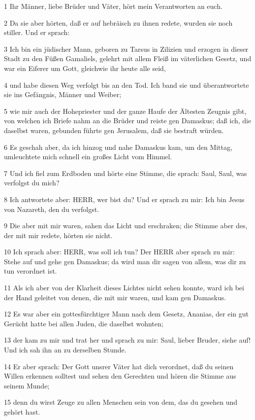 \par 1 Ihr Männer, liebe Brüder und Väter, hört mein Verantworten an euch.
\par 2 Da sie aber hörten, daß er auf hebräisch zu ihnen redete, wurden sie noch stiller. Und er sprach:
\par 3 Ich bin ein jüdischer Mann, geboren zu Tarsus in Zilizien und erzogen in dieser Stadt zu den Füßen Gamaliels, gelehrt mit allem Fleiß im väterlichen Gesetz, und war ein Eiferer um Gott, gleichwie ihr heute alle seid,
\par 4 und habe diesen Weg verfolgt bis an den Tod. Ich band sie und überantwortete sie ins Gefängnis, Männer und Weiber;
\par 5 wie mir auch der Hohepriester und der ganze Haufe der Ältesten Zeugnis gibt, von welchen ich Briefe nahm an die Brüder und reiste gen Damaskus; daß ich, die daselbst waren, gebunden führte gen Jerusalem, daß sie bestraft würden.
\par 6 Es geschah aber, da ich hinzog und nahe Damaskus kam, um den Mittag, umleuchtete mich schnell ein großes Licht vom Himmel.
\par 7 Und ich fiel zum Erdboden und hörte eine Stimme, die sprach: Saul, Saul, was verfolgst du mich?
\par 8 Ich antwortete aber: HERR, wer bist du? Und er sprach zu mir: Ich bin Jesus von Nazareth, den du verfolgst.
\par 9 Die aber mit mir waren, sahen das Licht und erschraken; die Stimme aber des, der mit mir redete, hörten sie nicht.
\par 10 Ich sprach aber: HERR, was soll ich tun? Der HERR aber sprach zu mir: Stehe auf und gehe gen Damaskus; da wird man dir sagen von allem, was dir zu tun verordnet ist.
\par 11 Als ich aber von der Klarheit dieses Lichtes nicht sehen konnte, ward ich bei der Hand geleitet von denen, die mit mir waren, und kam gen Damaskus.
\par 12 Es war aber ein gottesfürchtiger Mann nach dem Gesetz, Ananias, der ein gut Gerücht hatte bei allen Juden, die daselbst wohnten;
\par 13 der kam zu mir und trat her und sprach zu mir: Saul, lieber Bruder, siehe auf! Und ich sah ihn an zu derselben Stunde.
\par 14 Er aber sprach: Der Gott unsrer Väter hat dich verordnet, daß du seinen Willen erkennen solltest und sehen den Gerechten und hören die Stimme aus seinem Munde;
\par 15 denn du wirst Zeuge zu allen Menschen sein von dem, das du gesehen und gehört hast.

